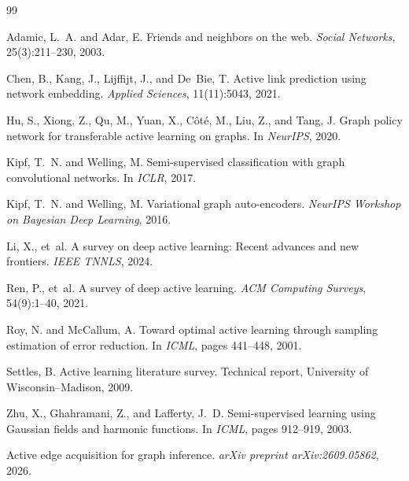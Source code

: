 \documentclass[12pt,a4paper,oneside]{report}
\begin{document}

\begin{thebibliography}{99}

Adamic, L.~A. and Adar, E.
\newblock Friends and neighbors on the web.
\newblock \emph{Social Networks}, 25(3):211--230, 2003.

Chen, B., Kang, J., Lijffijt, J., and De~Bie, T.
\newblock Active link prediction using network embedding.
\newblock \emph{Applied Sciences}, 11(11):5043, 2021.

Hu, S., Xiong, Z., Qu, M., Yuan, X., C\^{o}t\'{e}, M., Liu, Z., and Tang, J.
\newblock Graph policy network for transferable active learning on graphs.
\newblock In \emph{NeurIPS}, 2020.

Kipf, T.~N. and Welling, M.
\newblock Semi-supervised classification with graph convolutional networks.
\newblock In \emph{ICLR}, 2017.

Kipf, T.~N. and Welling, M.
\newblock Variational graph auto-encoders.
\newblock \emph{NeurIPS Workshop on Bayesian Deep Learning}, 2016.

Li, X., et~al.
\newblock A survey on deep active learning: Recent advances and new frontiers.
\newblock \emph{IEEE TNNLS}, 2024.

Ren, P., et~al.
\newblock A survey of deep active learning.
\newblock \emph{ACM Computing Surveys}, 54(9):1--40, 2021.

Roy, N. and McCallum, A.
\newblock Toward optimal active learning through sampling estimation of error reduction.
\newblock In \emph{ICML}, pages 441--448, 2001.

Settles, B.
\newblock Active learning literature survey.
\newblock Technical report, University of Wisconsin--Madison, 2009.

Zhu, X., Ghahramani, Z., and Lafferty, J.~D.
\newblock Semi-supervised learning using {G}aussian fields and harmonic functions.
\newblock In \emph{ICML}, pages 912--919, 2003.

Active edge acquisition for graph inference.
\newblock \emph{arXiv preprint arXiv:2609.05862}, 2026.

\end{thebibliography}
\end{document}
